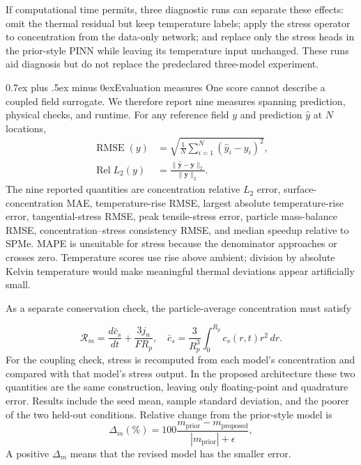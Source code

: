 \documentclass[conference]{IEEEtran}
\makeatletter
\newcommand{\headingfont}{\rmfamily}
\def\subsection{\@startsection{subsection}{2}{\z@}{1.5ex plus 1.5ex minus 0.5ex}%
{0.7ex plus .5ex minus 0ex}{\normalfont\headingfont\normalsize\bfseries}}
\makeatother
\begin{document}
If computational time permits, three diagnostic runs can separate these effects: omit the thermal residual but keep temperature labels; apply the stress operator to concentration from the data-only network; and replace only the stress heads in the prior-style PINN while leaving its temperature input unchanged. These runs aid diagnosis but do not replace the predeclared three-model experiment.

\subsection{Evaluation measures}
One score cannot describe a coupled field surrogate. We therefore report nine measures spanning prediction, physical checks, and runtime. For any reference field $y$ and prediction $\widehat y$ at $N$ locations,
\begin{align}
\operatorname{RMSE}(y)&=\sqrt{\frac{1}{N}\sum_{i=1}^{N}(\widehat y_i-y_i)^2},
\label{eq:rmse}\\
\operatorname{Rel}L_2(y)&=\frac{\|\widehat{\mathbf y}-\mathbf y\|_2}{\|\mathbf y\|_2}.
\label{eq:rell2}
\end{align}
The nine reported quantities are concentration relative $L_2$ error, surface-concentration MAE, temperature-rise RMSE, largest absolute temperature-rise error, tangential-stress RMSE, peak tensile-stress error, particle mass-balance RMSE, concentration--stress consistency RMSE, and median speedup relative to SPMe. MAPE is unsuitable for stress because the denominator approaches or crosses zero. Temperature scores use rise above ambient; division by absolute Kelvin temperature would make meaningful thermal deviations appear artificially small.

As a separate conservation check, the particle-average concentration must satisfy

\begin{equation}
\mathcal{R}_{m}=\frac{d\bar c_s}{dt}+\frac{3j_n}{FR_p},\quad
\bar c_s=\frac{3}{R_p^3}\int_0^{R_p}c_s(r,t)r^2\,dr.
\label{eq:mass}
\end{equation}
For the coupling check, stress is recomputed from each model's concentration and compared with that model's stress output. In the proposed architecture these two quantities are the same construction, leaving only floating-point and quadrature error. Results include the seed mean, sample standard deviation, and the poorer of the two held-out conditions. Relative change from the prior-style model is
\begin{equation}
\Delta_m(\%)=100\frac{m_{\mathrm{prior}}-m_{\mathrm{proposed}}}
{|m_{\mathrm{prior}}|+\epsilon},
\label{eq:gap}
\end{equation}
A positive $\Delta_m$ means that the revised model has the smaller error.
\end{document}
